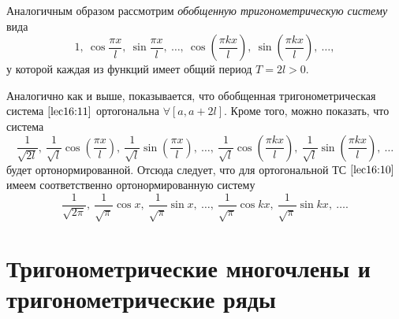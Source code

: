 \documentclass[../../main.tex]{subfiles}
\begin{document}
Аналогичным образом рассмотрим \emph{обобщенную тригонометрическую систему} 
вида 
\begin{equation}
\label{lec16:11}
1, \ \cos \frac{\pi x}{l}, \ \sin \frac{\pi x}{l}, \ \ldots, \ \cos 
\left(\frac{\pi kx}{l}\right), \
\sin \left(\frac{\pi kx}{l}\right), \ \ldots,
\end{equation}
у которой каждая из функций имеет общий период $T = 2l > 0$.

Аналогично как и выше, показывается, что обобщенная тригонометрическая 
система $\eqref{lec16:11}$ ортогональна $\forall [a, a+2l]$.
Кроме того, можно показать, что система \[\frac{1}{\sqrt{2l}},\ \frac{1}{\sqrt 
l}\cos\left(\frac{\pi x}{l}\right),\ \frac{1}{\sqrt l} \sin \left(\frac{\pi 
x}{l}\right),\ \ldots,\ \frac{1}{\sqrt l}\cos\left(\frac{\pi kx}{l}\right),\ 
\frac{1}{\sqrt l} \sin \left(\frac{\pi kx}{l}\right),\ \ldots \]
будет
ортонормированной. Отсюда следует, что для ортогональной ТС 
$\eqref{lec16:10}$
имеем соответственно ортонормированную систему 
\begin{equation}
\label{lec16:12}
\frac{1}{\sqrt{2\pi}}, \ \frac{1}{\sqrt \pi} \cos x, \ \frac{1}{\sqrt \pi} 
\sin 
x, \ \ldots,\ \frac{1}{\sqrt \pi} \cos kx, \ \frac{1}{\sqrt \pi} \sin kx,\ 
\ldots.
\end{equation}
\section{Тригонометрические многочлены и тригонометрические ряды}
\end{document}
